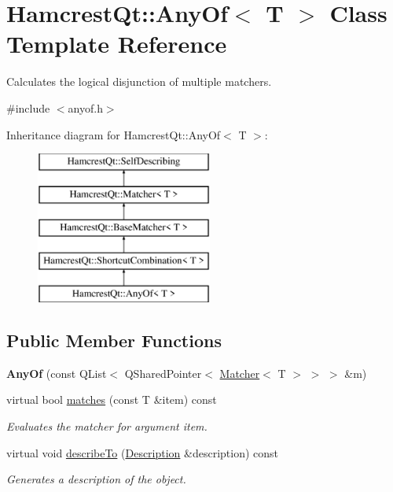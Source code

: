 \hypertarget{class_hamcrest_qt_1_1_any_of}{\section{Hamcrest\-Qt\-:\-:Any\-Of$<$ T $>$ Class Template Reference}
\label{class_hamcrest_qt_1_1_any_of}
}


Calculates the logical disjunction of multiple matchers.  




{\ttfamily \#include $<$anyof.\-h$>$}

Inheritance diagram for Hamcrest\-Qt\-:\-:Any\-Of$<$ T $>$\-:\begin{figure}[H]
\begin{center}
\leavevmode
\includegraphics[height=5.000000cm]{class_hamcrest_qt_1_1_any_of}
\end{center}
\end{figure}
\subsection*{Public Member Functions}
\begin{DoxyCompactItemize}
\item 
\hypertarget{class_hamcrest_qt_1_1_any_of_a7dc9177bd13e2b0aa5ce221e3d2587f5}{{\bfseries Any\-Of} (const Q\-List$<$ Q\-Shared\-Pointer$<$ \hyperlink{class_hamcrest_qt_1_1_matcher}{Matcher}$<$ T $>$ $>$ $>$ \&m)}\label{class_hamcrest_qt_1_1_any_of_a7dc9177bd13e2b0aa5ce221e3d2587f5}

\item 
virtual bool \hyperlink{class_hamcrest_qt_1_1_any_of_aa097e760ed6ce642c1ee40c73d73bdce}{matches} (const T \&item) const 
\begin{DoxyCompactList}\small\item\em Evaluates the matcher for argument {\itshape item}. \end{DoxyCompactList}\item 
virtual void \hyperlink{class_hamcrest_qt_1_1_any_of_a32a386c0a8f6bab40344199964c3d62f}{describe\-To} (\hyperlink{class_hamcrest_qt_1_1_description}{Description} \&description) const 
\begin{DoxyCompactList}\small\item\em Generates a description of the object. \end{DoxyCompactList}\end{DoxyCompactItemize}
